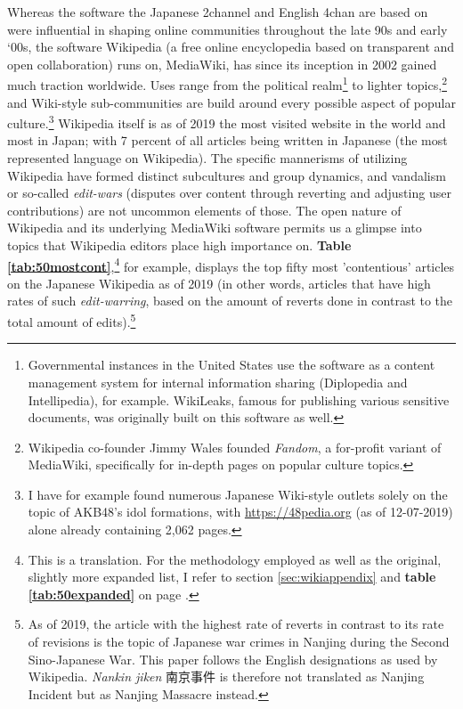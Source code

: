 \documentclass[10pt,british,A4paper,,openany]{memoir}
\begin{document}
Whereas the software the Japanese 2channel and English 4chan are based
on were influential in shaping online communities throughout the late
90s and early `00s, the software Wikipedia (a free online encyclopedia
based on transparent and open collaboration) runs on, MediaWiki, has
since its inception in 2002 gained much traction worldwide. Uses range
from the political realm\footnote{Governmental instances in the United
  States use the software as a content management system for internal
  information sharing (Diplopedia and Intellipedia), for example.
  WikiLeaks, famous for publishing various sensitive documents, was
  originally built on this software as well.} to lighter
topics,\footnote{Wikipedia co-founder Jimmy Wales founded \emph{Fandom},
  a for-profit variant of MediaWiki, specifically for in-depth pages on
  popular culture topics.} and Wiki-style sub-communities are build
around every possible aspect of popular culture.\footnote{I have for
  example found numerous Japanese Wiki-style outlets solely on the topic
  of AKB48's idol formations, with \url{https://48pedia.org} (as of
  12-07-2019) alone already containing 2,062 pages.} Wikipedia itself is
as of 2019 the  most visited website in the world and 
most in Japan; with 7 percent of all articles being written in Japanese
(the  most represented language on Wikipedia). The specific
mannerisms of utilizing Wikipedia have formed distinct subcultures and
group dynamics, and vandalism or so-called \emph{edit-wars} (disputes
over content through reverting and adjusting user contributions) are not
uncommon elements of those. The open nature of Wikipedia and its
underlying MediaWiki software permits us a glimpse into topics that
Wikipedia editors place high importance on. \textbf{Table
\ref{tab:50mostcont}},\footnote{This is a translation. For the
  methodology employed as well as the original, slightly more expanded
  list, I refer to section \ref{sec:wikiappendix} and \textbf{table
  \ref{tab:50expanded}} on page \pageref{tab:50expanded}.} for example,
displays the top fifty most 'contentious' articles on the Japanese
Wikipedia as of 2019 (in other words, articles that have high rates of
such \emph{edit-warring}, based on the amount of reverts done in
contrast to the total amount of edits).\footnote{As of 2019, the article
  with the highest rate of reverts in contrast to its rate of revisions
  is the topic of Japanese war crimes in Nanjing during the Second
  Sino-Japanese War. This paper follows the English designations as used
  by Wikipedia. \emph{Nankin jiken} 南京事件 is therefore not translated
  as Nanjing Incident but as Nanjing Massacre instead.}
\end{document}
